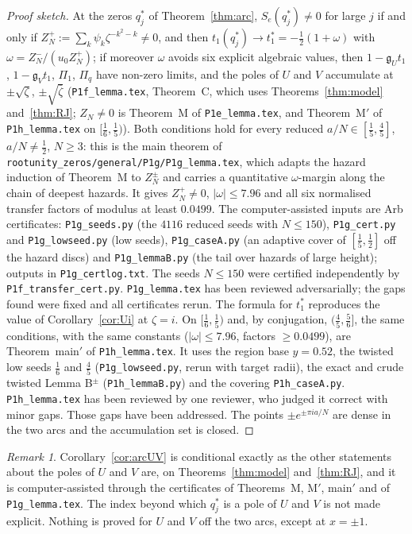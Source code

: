 \documentclass[11pt]{article}
\theoremstyle{plain}
\theoremstyle{definition}
\theoremstyle{remark}
\newtheorem{remark}[theorem]{Remark}
\theoremstyle{plain}\newtheorem*{maintheorem}{Main Theorem}
\begin{document}
\begin{proof}[Proof sketch]
At the zeros $q^\ast_j$ of Theorem~\ref{thm:arc}, $S_e(q^\ast_j)\ne0$ for large $j$ if and only if
$Z^+_N:=\sum_k\psi_k\zeta^{-k^2-k}\ne0$, and then $t_1(q^\ast_j)\to t_1^\ast=-\frac12(1+\omega)$ with
$\omega=Z^-_N/(u_0Z^+_N)$; if moreover $\omega$ avoids six explicit algebraic values, then
$1-\mathfrak g_Ut_1$, $1-\mathfrak g_Vt_1$, $\Pi_1$, $\Pi_q$ have non-zero limits, and the poles of $U$ and
$V$ accumulate at $\pm\sqrt\zeta$, $\pm\sqrt{\bar\zeta}$ (\texttt{P1f\_lemma.tex}, Theorem~C, which uses
Theorems~\ref{thm:model} and~\ref{thm:RJ}; $Z_N\ne0$ is Theorem~M of \texttt{P1e\_lemma.tex}, and Theorem~M$'$ of
\texttt{P1h\_lemma.tex} on $[\frac16,\frac15)$). Both
conditions hold for every reduced $a/N\in[\frac15,\frac45]$, $a/N\ne\frac12$, $N\ge3$: this is the main
theorem of \texttt{rootunity\_zeros/general/P1g/P1g\_lemma.tex}, which adapts the hazard induction of
Theorem~M to $Z^\pm_N$ and carries a quantitative $\omega$-margin along the chain of deepest hazards. It
gives $Z^+_N\ne0$, $|\omega|\le7.96$ and all six normalised transfer factors of modulus at least $0.0499$.
The computer-assisted inputs are Arb certificates: \texttt{P1g\_seeds.py} (the $4116$ reduced seeds with
$N\le150$), \texttt{P1g\_cert.py} and \texttt{P1g\_lowseed.py} (low seeds), \texttt{P1g\_caseA.py} (an
adaptive cover of $[\frac15,\frac12]$ off the hazard discs) and \texttt{P1g\_lemmaB.py} (the tail over
hazards of large height); outputs in \texttt{P1g\_certlog.txt}. The seeds $N\le150$ were certified
independently by \texttt{P1f\_transfer\_cert.py}. \texttt{P1g\_lemma.tex} has been reviewed
adversarially; the gaps found were fixed and all certificates rerun. The formula for $t_1^\ast$
reproduces the value of Corollary~\ref{cor:Ui} at $\zeta=i$. On $[\frac16,\frac15)$ and, by conjugation, $(\frac45,\frac56]$, the
same conditions, with the same constants ($|\omega|\le7.96$, factors $\ge0.0499$), are Theorem~main$'$ of
\texttt{P1h\_lemma.tex}. It uses the region base $y=0.52$, the twisted low seeds $\frac16$ and $\frac45$ (\texttt{P1g\_lowseed.py},
rerun with target radii), the exact and crude twisted Lemma B$^\pm$ (\texttt{P1h\_lemmaB.py}) and the covering
\texttt{P1h\_caseA.py}. \texttt{P1h\_lemma.tex} has been reviewed by one reviewer, who judged it correct with minor
gaps. Those gaps have been addressed. The points $\pm e^{\pm\pi ia/N}$ are dense in the
two arcs and the accumulation set is closed.
\end{proof}

\begin{remark}\label{rem:arcUV}
Corollary~\ref{cor:arcUV} is conditional exactly as the other statements about the poles of $U$ and $V$
are, on Theorems~\ref{thm:model} and~\ref{thm:RJ}, and it is computer-assisted through the certificates of
Theorems~M, M$'$, main$'$ and of \texttt{P1g\_lemma.tex}. The index beyond which $q^\ast_j$ is a pole of $U$ and $V$ is
not made explicit. Nothing is proved for $U$ and $V$ off the two arcs, except at $x=\pm1$.
\end{remark}
\end{document}
